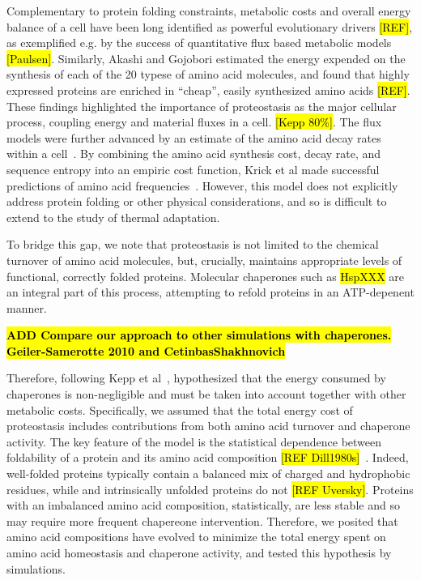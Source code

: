 \documentclass[10pt,letterpaper]{article}
\begin{document}
Complementary to protein folding constraints, metabolic costs and overall energy balance of a cell have been long identified as powerful evolutionary drivers \hl{[REF]}, as exemplified e.g. by the success of quantitative flux based metabolic models \hl{[Paulsen]}. Similarly, Akashi and Gojobori estimated the energy expended on the synthesis of each of the 20 typese of amino acid molecules, and found that highly expressed proteins are enriched in ``cheap'', easily synthesized amino acids \hl{[REF]}. These findings highlighted the importance of proteostasis as the major cellular process, coupling energy and material fluxes in a cell. \hl{[Kepp 80\%]}. The flux models were further advanced by an estimate of the amino acid decay rates within a cell~\cite{Krick2014Amino}. By combining the amino acid synthesis cost, decay rate, and sequence entropy into an empiric cost function, Krick et al made successful predictions of amino acid frequencies~\cite{Krick2014Amino}. However, this model does not explicitly address protein folding or other physical considerations, and so is difficult to extend to the study of thermal adaptation.

To bridge this gap, we note that proteostasis is not limited to the chemical turnover of amino acid molecules, but, crucially, maintains appropriate levels of functional, correctly folded proteins. Molecular chaperones such as \hl{HspXXX} are an integral part of this process, attempting to refold proteins in an ATP-depenent manner. 

\hl{\bf ADD Compare our approach to other simulations with chaperones. Geiler-Samerotte 2010 and Cetinbas\/Shakhnovich }

Therefore, following Kepp et al~\cite{Kepp2014Model}, hypothesized that the energy consumed by chaperones is non-negligible and must be taken into account together with other metabolic costs. Specifically, we assumed that the total energy cost of proteostasis includes contributions from both amino acid turnover and chaperone activity. The key feature of the model is the statistical dependence between foldability of a protein and its amino acid composition \hl{[REF Dill1980s]}~\cite{Berezovsky2007Positive,Venev2015Massively}. Indeed, well-folded proteins typically  contain a balanced mix of charged and hydrophobic residues, while and intrinsically unfolded proteins do not \hl{[REF Uversky]}. Proteins with an imbalanced amino acid composition, statistically, are less stable and so may require more frequent chapereone intervention. Therefore, we posited that amino acid compositions have evolved to minimize the total energy spent on amino acid homeostasis and chaperone activity, and tested this hypothesis by simulations.
\end{document}
